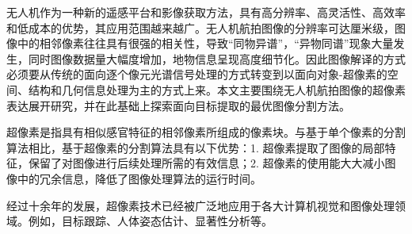 
无人机作为一种新的遥感平台和影像获取方法，具有高分辨率、高灵活性、高效率和低成本的优势，其应用范围越来越广。无人机航拍图像的分辨率可达厘米级，图像中的相邻像素往往具有很强的相关性，导致“同物异谱”，“异物同谱”现象大量发生，同时图像数据量大幅度增加，地物信息呈现高度细节化。因此图像解译的方式必须要从传统的面向逐个像元光谱信号处理的方式转变到以面向对象-超像素的空间、结构和几何信息处理为主的方式上来。本文主要围绕无人机航拍图像的超像素表达展开研究，并在此基础上探索面向目标提取的最优图像分割方法。

超像素是指具有相似感官特征的相邻像素所组成的像素块。与基于单个像素的分割算法相比，基于超像素的分割算法具有以下优势：1. 超像素提取了图像的局部特征，保留了对图像进行后续处理所需的有效信息；2. 超像素的使用能大大减小图像中的冗余信息，降低了图像处理算法的运行时间。

经过十余年的发展，超像素技术已经被广泛地应用于各大计算机视觉和图像处理领域。例如，目标跟踪、人体姿态估计、显著性分析等。
